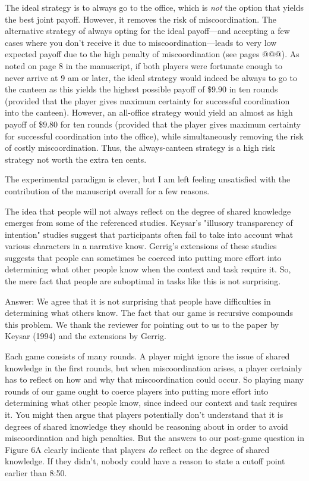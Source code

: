 \documentclass[a4paper]{article}
\newenvironment{response}{\smallskip \noindent \color{blue}}{\color{black}\smallskip}
\newenvironment{robin}{\smallskip \noindent \color{red!10!green!50!blue}}{\color{black}\smallskip}
\newenvironment{tobo}{\smallskip \noindent \color{yellow!80!black!80}}{\color{black}\smallskip}
\begin{document}
\begin{response} 
The ideal strategy is to always go to the office, which is \emph{not} the option that yields the best joint payoff. However, it removes the risk of miscoordination. The alternative strategy of always opting for the ideal payoff---and accepting a few cases where you don't receive it due to miscoordination---leads to very low expected payoff due to the high penalty of miscoordination (see pages @@@). As noted on page 8 in the manuscript, if both players were fortunate enough to never arrive at 9 am or later, the ideal strategy would indeed be always to go to the canteen as this yields the highest possible payoff of \$$9.90$ in ten rounds (provided that the player gives maximum certainty for successful coordination into the canteen). However, an all-office strategy would yield an almost as high payoff of \$$9.80$ for ten rounds (provided that the player gives maximum certainty for successful coordination into the office), while simultaneously removing the risk of costly miscoordination. Thus, the always-canteen strategy is a high risk strategy not worth the extra ten cents.
\end{response}

The experimental paradigm is clever, but I am left feeling unsatisfied with the contribution of the manuscript overall for a few reasons.

The idea that people will not always reflect on the degree of shared knowledge emerges from some of the referenced studies. Keysar's "illusory transparency of intention" studies suggest that participants often fail to take into account what various characters in a narrative know. Gerrig's extensions of these studies suggests that people can sometimes be coerced into putting more effort into determining what other people know when the context and task require it. So, the mere fact that people are suboptimal in tasks like this is not surprising.

\begin{robin} Answer: We agree that it is not surprising that people have difficulties in determining what others know. The fact that our game is recursive compounds this problem. We thank the reviewer for pointing out to us to the paper by Keysar (1994) and the extensions by Gerrig.
\end{robin}

\begin{tobo}
Each game consists of many rounds. A player might ignore the issue of shared knowledge in the first rounds, but when miscoordination arises, a player certainly has to reflect on how and why that miscoordination could occur. So playing many rounds of our game ought to coerce players into putting more effort into determining what other people know, since indeed our context and task requires it. You might then argue that players potentially don't understand that it is degrees of shared knowledge they should be reasoning about in order to avoid miscoordination and high penalties. But the answers to our post-game question in Figure 6A clearly indicate that players \emph{do} reflect on the degree of shared knowledge. If they didn't, nobody could have a reason to state a cutoff point earlier than 8:50.
\end{tobo}
\end{document}
